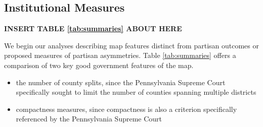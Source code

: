         \subsection*{Institutional Measures}
    
        \begin{center}\textbf{INSERT TABLE \ref{tab:summaries} ABOUT HERE} \end{center}
\par
    We begin our analyses describing map features distinct from partisan outcomes or proposed measures of partisan asymmetries. Table \ref{tab:summaries} offers a comparison of two key good government features of the map.
%
    \begin{itemize}
        \item the number of county splits, since the Pennsylvania Supreme Court specifically sought to limit the number of counties spanning multiple districts
        \item compactness measures, since compactness is also a criterion specifically referenced by the Pennsylvania Supreme Court
    \end{itemize}
%
\par
